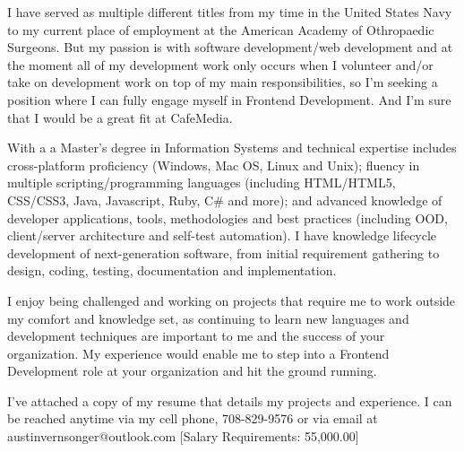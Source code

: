 \documentclass[9pt, a4paper]{awesome-cv}
\begin{document}
\makecvheader

\makelettertitle

\begin{cvletter}




I have served as multiple different titles from my time in the United States Navy to my current place of employment at the American Academy of Othropaedic Surgeons. But my passion is with software development/web development and at the moment all of my development work only occurs when I volunteer and/or take on development work on top of my main responsibilities, so I'm seeking a position where I can fully engage myself in Frontend Development. And I'm sure that I would be a great fit at
CafeMedia. 

With a a Master’s degree in Information Systems and technical expertise includes cross-platform proficiency (Windows, Mac OS, Linux and Unix); fluency in multiple scripting/programming languages (including HTML/HTML5, CSS/CSS3, Java, Javascript, Ruby, C# and more); and advanced knowledge of developer applications, tools, methodologies and best practices (including OOD, client/server architecture and self-test automation). I have knowledge lifecycle development of next-generation software, from initial requirement gathering to design, coding, testing, documentation and implementation.

I enjoy being challenged and working on projects that require me to work outside my comfort and knowledge set, as continuing to learn new languages and development techniques are important to me and the success of your organization. My experience would enable me to step into a Frontend Development role at your organization and hit the ground running.

I’ve attached a copy of my resume that details my projects and experience. I can be reached anytime via my cell phone, 708-829-9576 or via email at austinvernsonger@outlook.com [Salary Requirements: 55,000.00]



\end{cvletter}

\makeletterclosing
\end{document}
